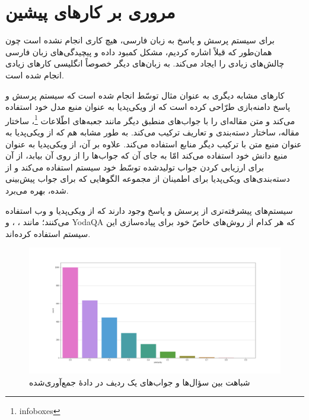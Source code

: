 \documentclass{CCI2020}
\begin{document}
\section{مروری بر کارهای پیشین}
برای سیستم پرسش و پاسخ به زبان فارسی، هیچ کاری انجام نشده است چون همان‌طور که قبلاً اشاره کردیم، مشکل کمبود داده و پیچیدگی‌های زبان فارسی چالش‌های زیادی را ایجاد می‌کند. به زبان‌های دیگر خصوصاً انگلیسی کارهای زیادی انجام شده است.

کارهای مشابه دیگری به عنوان مثال توسّط  \cite{ref3} انجام شده است که سیستم پرسش و پاسخ دامنه‌بازی طرّاحی کرده است که از ویکی‌پدیا به عنوان منبع مدل خود استفاده می‌کند و متن مقاله‌ای را با جواب‌های منطبق دیگر مانند جعبه‌های اطّلاعات \footnote{infoboxes}، ساختار مقاله، ساختار دسته‌بندی و تعاریف ترکیب می‌کند. به طور مشابه  \cite{ref4} هم که از ویکی‌پدیا به عنوان منبع متن با ترکیب دیگر منابع استفاده می‌کند.
علاوه بر آن،  \cite{ref5} از ویکی‌پدیا به عنوان منبع دانش خود استفاده می‌کند امّا به جای آن که جواب‌ها را از روی آن بیابد، از آن برای ارزیابی کردن جواب تولید‌شده توسّط خود سیستم استفاده می‌کند و از دسته‌بندی‌های ویکی‌پدیا برای اطمینان از مجموعه الگوهایی که برای جواب پیش‌بینی‌ شده، بهره می‌برد.

سیستم‌های پیشرفته‌تری از پرسش و پاسخ وجود دارند که از ویکی‌پدیا و وب استفاده می‌کنند؛ مانند ،  \cite{ref6}،   و YodaQA \cite{ref7} که هر کدام از روش‌های خاصّ خود برای پیاده‌سازی این سیستم استفاده کرده‌اند.


\begin{figure}[t]
  \begin{minipage}[t]{\linewidth}
    \includegraphics[width=\linewidth]{images/similarity_count.png}
    \caption{شباهت بین سؤال‌ها و جواب‌های یک ردیف در دادهٔ جمع‌آوری‌شده}
    \label{fig:sim}
  \end{minipage}\hfill%
\end{figure}
\end{document}
